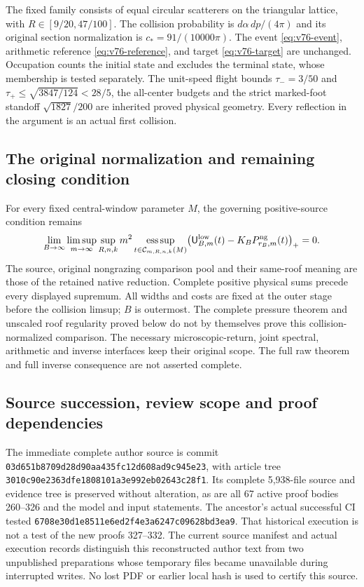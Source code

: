 \documentclass[11pt,reqno]{amsart}
\numberwithin{equation}{section}
\theoremstyle{definition}\newtheorem{definition}[theorem]{Definition}
\theoremstyle{remark}\newtheorem{remark}[theorem]{Remark}
\begin{document}
The fixed family consists of equal circular scatterers on the
triangular lattice, with $R\in[9/20,47/100]$. The collision probability
is $d\alpha\,dp/(4\pi)$ and its original section normalization is
$c_*=91/(10000\pi)$. The event \eqref{eq:v76-event}, arithmetic
reference \eqref{eq:v76-reference}, and target \eqref{eq:v76-target}
are unchanged. Occupation counts the initial state and excludes
the terminal state, whose membership is tested separately.
The unit-speed flight bounds
$\tau_-=3/50$ and $\tau_+\le\sqrt{3847/124}<28/5$, the all-center
budgets and the strict marked-foot standoff $\sqrt{1827}/200$
are inherited proved physical geometry. Every reflection in the
argument is an actual first collision.



\subsection*{The original normalization and remaining closing condition}
For every fixed central-window parameter $M$, the governing
positive-source condition remains
\begin{equation}\label{eq:sc-original-obligation}
 \lim_{B\to\infty}\limsup_{m\to\infty}\sup_{R,n,k}
 m^2\operatorname*{ess\,sup}_{t\in\mathcal C_{m,R,n,k}(M)}
 \bigl(\mathsf U^{\rm low}_{B,m}(t)
                    -K_BP^{\rm ng}_{r_B,m}(t)\bigr)_+=0.
\end{equation}
The source, original nongrazing comparison pool and their same-roof
meaning are those of the retained native reduction. Complete positive
physical sums precede every displayed supremum. All widths and costs
are fixed at the outer stage before the collision limsup; $B$ is
outermost. The complete pressure theorem and unscaled roof regularity
proved below do not by themselves prove this collision-normalized
comparison. The necessary microscopic-return, joint spectral,
arithmetic and inverse interfaces keep their original scope. The
full raw theorem and full inverse consequence are not asserted complete.

\subsection*{Source succession, review scope and proof dependencies}
The immediate complete author source is commit
\texttt{03d651b8\allowbreak{}709d28d9\allowbreak{}0aa435fc\allowbreak{}12d608ad\allowbreak{}9c945e23},
with article tree
\texttt{3010c90e\allowbreak{}2363dfe1\allowbreak{}808101a3\allowbreak{}e992eb02\allowbreak{}643c28f1}.
Its complete 5,938-file source and evidence tree is preserved without
alteration, as are all 67 active proof bodies 260--326 and the model
and input statements. The ancestor's actual successful CI tested
\texttt{6708e30d\allowbreak{}1e8511e6\allowbreak{}ed2f4e3a\allowbreak{}6247c096\allowbreak{}28bd3ea9}.
That historical execution is not a test of the new proofs 327--332.
The current source manifest and actual execution records distinguish
this reconstructed author text from two unpublished preparations
whose temporary files became unavailable during interrupted writes.
No lost PDF or earlier local hash is used to certify this source.
\end{document}
